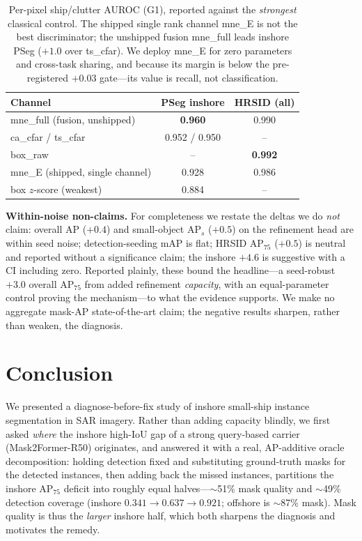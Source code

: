 \documentclass[journal]{IEEEtran}
\begin{document}
\begin{table}[t]
\centering
\caption{Per-pixel ship/clutter AUROC (G1), reported against the \emph{strongest} classical control. The shipped single rank channel mne\_E is not the best discriminator; the unshipped fusion mne\_full leads inshore PSeg ($+1.0$ over ts\_cfar). We deploy mne\_E for zero parameters and cross-task sharing, and because its margin is below the pre-registered $+0.03$ gate---its value is recall, not classification.}
\label{tab:g1}
\begin{tabular}{@{}lcc@{}}
\toprule
Channel & PSeg inshore & HRSID (all) \\
\midrule
mne\_full (fusion, unshipped)   & \textbf{0.960} & 0.990 \\
ca\_cfar / ts\_cfar             & 0.952 / 0.950 & -- \\
box\_raw                        & --            & \textbf{0.992} \\
mne\_E (shipped, single channel)& 0.928         & 0.986 \\
box $z$-score (weakest)         & 0.884         & -- \\
\bottomrule
\end{tabular}
\end{table}

\textbf{Within-noise non-claims.} For completeness we restate the deltas we do \emph{not} claim: overall AP ($+0.4$) and small-object AP$_{s}$ ($+0.5$) on the refinement head are within seed noise; detection-seeding mAP is flat; HRSID AP$_{75}$ ($+0.5$) is neutral and reported without a significance claim; the inshore $+4.6$ is suggestive with a CI including zero. Reported plainly, these bound the headline---a seed-robust $+3.0$ overall AP$_{75}$ from added refinement \emph{capacity}, with an equal-parameter control proving the mechanism---to what the evidence supports. We make no aggregate mask-AP state-of-the-art claim; the negative results sharpen, rather than weaken, the diagnosis.

\section{Conclusion}
\label{sec:conclusion}
We presented a diagnose-before-fix study of inshore small-ship instance segmentation in SAR imagery. Rather than adding capacity blindly, we first asked \emph{where} the inshore high-IoU gap of a strong query-based carrier (Mask2Former-R50) originates, and answered it with a real, AP-additive oracle decomposition: holding detection fixed and substituting ground-truth masks for the detected instances, then adding back the missed instances, partitions the inshore AP$_{75}$ deficit into roughly equal halves---$\sim$51\% mask quality and $\sim$49\% detection coverage (inshore $0.341\!\rightarrow\!0.637\!\rightarrow\!0.921$; offshore is $\sim$87\% mask). Mask quality is thus the \emph{larger} inshore half, which both sharpens the diagnosis and motivates the remedy.
\end{document}

